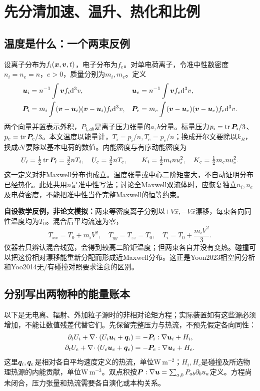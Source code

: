 \documentclass[UTF8,a4paper,11pt,openany,fontset=fandol]{ctexbook}
\begin{document}
\chapter{先分清加速、温升、热化和比例}
\section{温度是什么：一个两束反例}
设离子分布为$f_i(\bm{x},\bm{v},t)$，电子分布为$f_e$。对单电荷离子，令准中性数密度$n_i=n_e=n$，$e>0$，质量分别为$m_i,m_e$。定义
\begin{align}
\bm{u}_i&=n^{-1}\int\bm{v} f_i\mathrm d^3v,&\bm{u}_e&=n^{-1}\int\bm{v} f_e\mathrm d^3v,\\
\bm{P}_i&=m_i\int(\bm{v}-\bm{u}_i)(\bm{v}-\bm{u}_i)f_i\mathrm d^3v,&
\bm{P}_e&=m_e\int(\bm{v}-\bm{u}_e)(\bm{v}-\bm{u}_e)f_e\mathrm d^3v.
\end{align}
两个向量并置表示外积，$P_{i,ab}$是离子压力张量的$a,b$分量。标量压力$p_i=\operatorname{tr}\bm{P}_i/3$、$p_e=\operatorname{tr}\bm{P}_e/3$。本文温度以能量计，$T_i=p_i/n,T_e=p_e/n$；换成开尔文要除以$k_B$，换成eV要除以基本电荷的数值。内能密度与有序动能密度为
\begin{equation}
 U_i=\tfrac12\operatorname{tr}\bm{P}_i=\tfrac32nT_i,\quad
 U_e=\tfrac32nT_e,\qquad K_i=\tfrac12m_inu_i^2,\quad K_e=\tfrac12m_enu_e^2.
\end{equation}
这一定义对非Maxwell分布也成立。温度张量或中心二阶矩变大，不自动证明分布已经热化。此处共用$n$是准中性写法；讨论全Maxwell双流体时，应恢复独立$n_i,n_e$及电荷密度，不能把准中性当作完整Maxwell的恒等约束。

\textbf{自设教学反例，非论文模拟：}两束等密度离子分别以$+V\hat x,-V\hat x$漂移，每束各向同性温度均为$T_0$。混合后平均流速为零，
\begin{equation}
 T_{xx}=T_0+m_iV^2,\quad T_{yy}=T_{zz}=T_0,\quad T_i=T_0+\frac{m_iV^2}{3}.
\end{equation}
仪器若只辨认混合线宽，会得到较高二阶矩温度；但两束各自并没有变热。碰撞可以把这份相对漂移能重新分配而形成近Maxwell分布。这正是Yoon2023相空间分析和Yoo2014无/有碰撞对照要求注意的区别。\citep{Yoon2023PhaseSpace,F679}

\section{分别写出两物种的能量账本}
以下是无电离、辐射、外加粒子源时的非相对论矩方程；实际装置如有这些源必须增加，不能让数值残差代替它们。先保留完整压力与热流，不预先假定各向同性：
\begin{align}
 \partial_t U_i+\nabla\!\cdot(U_i\bm{u}_i+\bm{q}_i)
 &=-\bm{P}_i:\nabla\bm{u}_i+H_i,\label{eq:ioninternal}\\
 \partial_t U_e+\nabla\!\cdot(U_e\bm{u}_e+\bm{q}_e)
 &=-\bm{P}_e:\nabla\bm{u}_e+H_e.\label{eq:electroninternal}
\end{align}
这里$\bm{q}_i,\bm{q}_e$是相对各自平均速度定义的热流，单位$\mathrm{W\,m^{-2}}$；$H_i,H_e$是碰撞及所选物理热源的内能贡献，单位$\mathrm{W\,m^{-3}}$。双点积按$\bm{P}:\nabla\bm{u}=\sum_{a,b}P_{ab}\partial_bu_a$定义。方程尚未闭合，压力张量和热流需要各自演化或本构关系。
\end{document}
